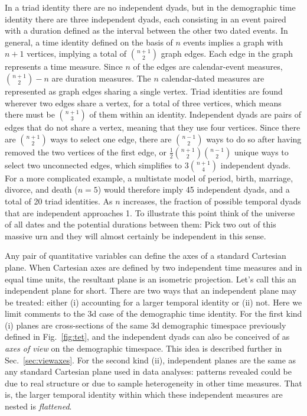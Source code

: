 \documentclass{bmcart}
\begin{document}
 In a triad identity there are no independent dyads, but in the demographic time identity there are three independent dyads, each consisting in an event paired with a duration defined as the interval between the other two dated events. In general, a time identity defined on the basis of $n$ events implies a graph with $n+1$ vertices, implying a total of $\binom{n+1}{2}$ graph edges. Each edge in the graph represents a time measure. Since $n$ of the edges are calendar-event measures, $\binom{n+1}{2} - n$ are duration measures. The $n$ calendar-dated measures are represented as graph edges sharing a single vertex. Triad identities are found wherever two edges share a vertex, for a total of three vertices, which means there must be $\binom{n+1}{3}$ of them within an identity. Independent dyads are pairs of edges that do not share a vertex, meaning that they use four vertices. Since there are $\binom{n+1}{2}$ ways to select one edge, there are $\binom{n-1}{2}$ ways to do so after having removed the two vertices of the first edge, or $\frac{1}{2}\binom{n+1}{2}\binom{n-1}{2}$ unique ways to select two unconnected edges, which simplifies to $3\binom{n+1}{4}$ independent dyads. For a more complicated example, a multistate model of period, birth, marriage, divorce, and death ($n=5$) would therefore imply 45 independent dyads, and a total of 20 triad identities. As $n$ increases, the fraction of possible temporal dyads that are independent approaches 1. To illustrate this point think of the universe of all dates and the potential durations between them: Pick two out of this massive urn and they will almost certainly be independent in this sense.

Any pair of quantitative variables can define the axes of a standard Cartesian plane. When Cartesian axes are defined by two independent time measures and in equal time units, the resultant plane is an isometric projection. Let's call this an independent plane for short. There are two ways that an independent plane may be treated: either (i) accounting for a larger temporal identity or (ii) not. Here we limit comments to the 3d case of the demographic time identity. For the first kind (i) planes are cross-sections of the same 3d demographic timespace previously defined in Fig.~\ref{fig:tet}, and the independent dyads can also be conceived of as \emph{axes of view} on the demographic timespace. This idea is described further in Sec.~\ref{sec:viewaxes}. For the second kind (ii), independent planes are the same as any standard Cartesian plane used in data analyses: patterns revealed could be due to real structure or due to sample heterogeneity in other time measures. That is, the larger temporal identity within which these independent measures are nested is \emph{flattened}.
\end{document}
